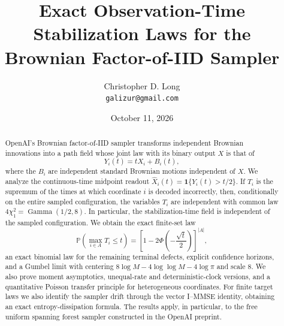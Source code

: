 \documentclass[11pt]{article}
\title{Exact Observation-Time Stabilization Laws for the Brownian Factor-of-IID Sampler}
\author{Christopher D. Long\\\texttt{galizur@gmail.com}}
\date{October 11, 2026}
\numberwithin{equation}{section}
\theoremstyle{definition}
\theoremstyle{remark}
\theoremstyle{plain}
\renewcommand{\P}{\mathbb{P}}
\newcommand{\1}{\mathbf{1}}
\DeclareMathOperator{\GammaLaw}{Gamma}
\begin{document}
\maketitle

\begin{abstract}
OpenAI's Brownian factor-of-IID sampler transforms independent Brownian
innovations into a path field whose joint law with its binary output $X$ is
that of
\[
  Y_i(t)=tX_i+B_i(t),
\]
where the $B_i$ are independent standard Brownian motions independent of
$X$.  We analyze the continuous-time midpoint readout
$\widehat X_i(t)=\1\{Y_i(t)>t/2\}$.  If $T_i$ is the supremum of the times at which
coordinate $i$ is decoded incorrectly, then, conditionally on the entire
sampled configuration, the variables $T_i$ are independent with common law
$4\chi_1^2=\GammaLaw(1/2,8)$.  In particular, the stabilization-time field
is independent of the sampled configuration.  We obtain the exact finite-set
law
\[
  \P\!\left(\max_{i\in A}T_i\le t\right)
  =\left[1-2\Phi\!\left(-\frac{\sqrt t}{2}\right)\right]^{|A|},
\]
an exact binomial law for the remaining terminal defects, explicit confidence
horizons, and a Gumbel limit with centering
$8\log M-4\log\log M-4\log\pi$ and scale $8$.  We also prove moment
asymptotics, unequal-rate and deterministic-clock versions, and a quantitative
Poisson transfer principle for heterogeneous coordinates.  For finite
target laws we also identify the sampler drift through the vector I--MMSE
identity, obtaining an exact entropy-dissipation formula.  The results apply,
in particular, to the free uniform spanning forest sampler constructed in the
OpenAI preprint.
\end{abstract}











\end{document}
